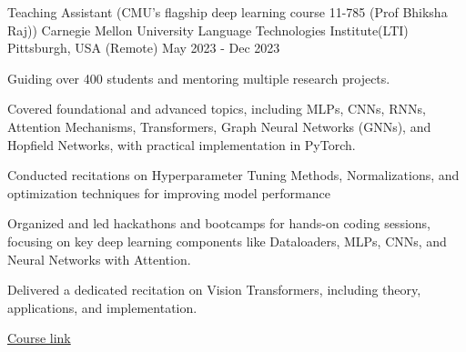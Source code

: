 \begin{cventries}
	\cvExperience
	{Teaching Assistant (CMU's flagship deep learning course 11-785 (Prof Bhiksha Raj))} %
	{Carnegie Mellon University Language Technologies Institute(LTI)} %
	{Pittsburgh, USA (Remote)} %
	{May 2023 - Dec 2023} %
	{
		\begin{cvitems} %
			\item {Guiding over 400 students and mentoring multiple research projects.}
			\item {Covered foundational and advanced topics, including MLPs, CNNs, RNNs, Attention Mechanisms, Transformers, Graph Neural Networks (GNNs), and 
            Hopfield Networks, with practical implementation in PyTorch.}
			\item {Conducted recitations on Hyperparameter Tuning Methods, Normalizations, and optimization techniques for improving model performance}
			\item {Organized and led hackathons and bootcamps for hands-on coding sessions, focusing on key deep learning components like Dataloaders, 
      MLPs, CNNs, and Neural Networks with Attention.}
			\item {Delivered a dedicated recitation on Vision Transformers, including theory, applications, and implementation.}
		\end{cvitems}
	}
  {\href{https://deeplearning.cs.cmu.edu/F23/index.html}{Course link}} %

\end{cventries}
